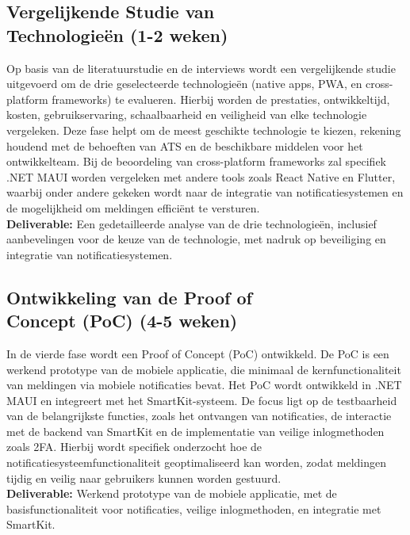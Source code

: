 \subsection{Vergelijkende Studie van \\Technologieën (1-2 weken)}
\noindent Op basis van de literatuurstudie en de interviews wordt een vergelijkende studie uitgevoerd om de drie geselecteerde technologieën (native apps, PWA, en cross-platform frameworks) te evalueren. Hierbij worden de prestaties, ontwikkeltijd, kosten, gebruikservaring, schaalbaarheid en veiligheid van elke technologie vergeleken. Deze fase helpt om de meest geschikte technologie te kiezen, rekening houdend met de behoeften van ATS en de beschikbare middelen voor het ontwikkelteam. Bij de beoordeling van cross-platform frameworks zal specifiek .NET MAUI worden vergeleken met andere tools zoals React Native en Flutter, waarbij onder andere gekeken wordt naar de integratie van notificatiesystemen en de mogelijkheid om meldingen efficiënt te versturen. \\

\noindent \textbf{Deliverable:} Een gedetailleerde analyse van de drie technologieën, inclusief aanbevelingen voor de keuze van de technologie, met nadruk op beveiliging en integratie van notificatiesystemen.

\subsection{Ontwikkeling van de Proof of \\Concept (PoC) (4-5 weken)}
\noindent In de vierde fase wordt een Proof of Concept (PoC) ontwikkeld. De PoC is een werkend prototype van de mobiele applicatie, die minimaal de kernfunctionaliteit van meldingen via mobiele notificaties bevat. Het PoC wordt ontwikkeld in .NET MAUI en integreert met het SmartKit-systeem. De focus ligt op de testbaarheid van de belangrijkste functies, zoals het ontvangen van notificaties, de interactie met de backend van SmartKit en de implementatie van veilige inlogmethoden zoals 2FA. Hierbij wordt specifiek onderzocht hoe de notificatiesysteemfunctionaliteit geoptimaliseerd kan worden, zodat meldingen tijdig en veilig naar gebruikers kunnen worden gestuurd. \\

\noindent \textbf{Deliverable:} Werkend prototype van de mobiele applicatie, met de basisfunctionaliteit voor notificaties, veilige inlogmethoden, en integratie met SmartKit.

